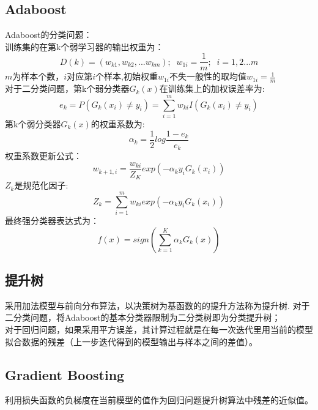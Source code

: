 \documentclass[UTF8]{article}%
\begin{document}
  		\subsection{Adaboost}
			Adaboost的分类问题：\\
			训练集的在第k个弱学习器的输出权重为：$$D(k) = (w_{k1}, w_{k2}, ...w_{km}) ;\;\; w_{1i}=\frac{1}{m};\;\; i =1,2...m$$ $m$为样本个数，$i$对应第$i$个样本,初始权重$ w_{1i}$不失一般性的取均值$ w_{1i}=\frac{1}{m}$\\
			对于二分类问题，第k个弱分类器$G_k(x)$在训练集上的加权误差率为:
			$$e_k = P(G_k(x_i) \neq y_i) = \sum\limits_{i=1}^{m}w_{ki}I(G_k(x_i) \neq y_i)$$
			第k个弱分类器$G_k(x)$的权重系数为:$$\alpha_k = \frac{1}{2}log\frac{1-e_k}{e_k}$$
			权重系数更新公式：$$w_{k+1,i} = \frac{w_{ki}}{Z_K}exp(-\alpha_ky_iG_k(x_i))$$
			$Z_k$是规范化因子:$$Z_k = \sum\limits_{i=1}^{m}w_{ki}exp(-\alpha_ky_iG_k(x_i))$$
			最终强分类器表达式为：$$f(x) = sign(\sum\limits_{k=1}^{K}\alpha_kG_k(x))$$
		
		\subsection{提升树}
		采用加法模型与前向分布算法，以决策树为基函数的的提升方法称为提升树.
		对于二分类问题，将Adaboost的基本分类器限制为二分类树即为分类提升树；\\
		对于回归问题，如果采用平方误差，其计算过程就是在每一次迭代里用当前的模型拟合数据的残差（上一步迭代得到的模型输出与样本之间的差值）。
		\subsection{Gradient Boosting}
		\color{red}利用损失函数的负梯度在当前模型的值作为回归问题提升树算法中残差的近似值。\color{black}
\end{document}
